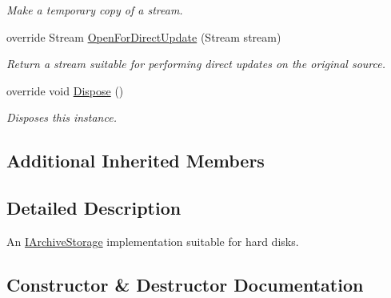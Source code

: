 \begin{DoxyCompactItemize}
\begin{DoxyCompactList}\small\item\em Make a temporary copy of a stream. \end{DoxyCompactList}\item 
override Stream \hyperlink{class_i_c_sharp_code_1_1_sharp_zip_lib_1_1_zip_1_1_disk_archive_storage_afa463d93f03caa3af6e4ea89a1314a99}{Open\+For\+Direct\+Update} (Stream stream)
\begin{DoxyCompactList}\small\item\em Return a stream suitable for performing direct updates on the original source. \end{DoxyCompactList}\item 
override void \hyperlink{class_i_c_sharp_code_1_1_sharp_zip_lib_1_1_zip_1_1_disk_archive_storage_a55cb8ad8e73dcd8196fce9c0b41336d9}{Dispose} ()
\begin{DoxyCompactList}\small\item\em Disposes this instance. \end{DoxyCompactList}\end{DoxyCompactItemize}
\subsection*{Additional Inherited Members}


\subsection{Detailed Description}
An \hyperlink{interface_i_c_sharp_code_1_1_sharp_zip_lib_1_1_zip_1_1_i_archive_storage}{I\+Archive\+Storage} implementation suitable for hard disks. 



\subsection{Constructor \& Destructor Documentation}
\mbox{\label{class_i_c_sharp_code_1_1_sharp_zip_lib_1_1_zip_1_1_disk_archive_storage_a3eb9cf48fc26e29b96cb3e1a7119f546}} 

